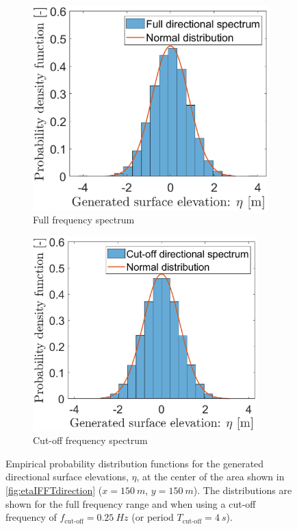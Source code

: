 \begin{figure}[htb]
\begin{subfigure}[t]{.5\textwidth}
    \centering
    \includegraphics[width=.95\textwidth,trim=0cm 0cm 0.0cm 0cm, clip=true]{Figures/Plots/etaIFFTdistdir.eps}
    \caption{Full frequency spectrum}
    \label{fig:etaIFFTHistdir}
\end{subfigure}%
\begin{subfigure}[t]{.5\textwidth}
    \centering
    \includegraphics[width=0.95\textwidth,trim=0cm 0cm 0cm 0cm, clip=true]{Figures/Plots/etaIFFTdistdircut.eps}
    \caption{Cut-off frequency spectrum}
    \label{fig:etaIFFTHistdircut}
\end{subfigure}
\caption{Empirical probability distribution functions for the generated directional surface elevations, $\eta$, at the center of the area shown in \cref{fig:etaIFFTdirection} ($x=\SI{150}{m}$, $y=\SI{150}{m}$). The distributions are shown for the full frequency range and when using a cut-off frequency of $f_{\text{cut-off}}=\SI{0.25}{Hz}$ (or period $T_{\text{cut-off}}=\SI{4}{s}$).}
\label{fig:etaIFFTdirDistributions}
\end{figure}